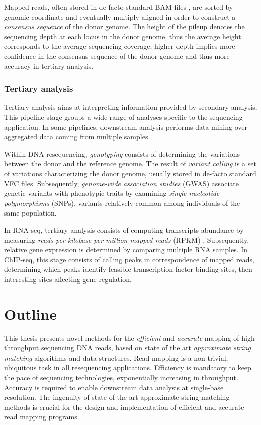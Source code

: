 Mapped reads, often stored in de-facto standard BAM files \citep{Li2009a}, are sorted by genomic coordinate and eventually multiply aligned in order to construct a \emph{consensus sequence} of the donor genome.
The height of the pileup denotes the sequencing depth at each locus in the donor genome, thus the average height corresponds to the average sequencing coverage;
higher depth implies more confidence in the consensus sequence of the donor genome and thus more accuracy in tertiary analysis.

\subsubsection{Tertiary analysis}

Tertiary analysis aims at interpreting information provided by secondary analysis.
This pipeline stage groups a wide range of analyses specific to the sequencing application.
In some pipelines, downstream analysis performs data mining over aggregated data coming from multiple samples.

Within DNA resequencing, \emph{genotyping} consists of determining the variations between the donor and the reference genome.
The result of \emph{variant calling} is a set of variations characterizing the donor genome, usually stored in de-facto standard VFC files.
Subsequently, \emph{genome-wide association studies} (GWAS) associate genetic variants with phenotypic traits by examining \emph{single-nucleotide polymorphisms} (SNPs), variants relatively common among individuals of the same population.

In RNA-seq, tertiary analysis consists of computing transcripts abundance by measuring \emph{reads per kilobase per million mapped reads} (RPKM) \citep{Mortazavi2008}.
Subsequently, relative gene expression is determined by comparing multiple RNA samples.
In ChIP-seq, this stage consists of calling peaks in correspondence of mapped reads, determining which peaks identify feasible transcription factor binding sites, then interesting sites affecting gene regulation.


\section{Outline}
\label{sec:intro:outline}

This thesis presents novel methods for the \emph{efficient} and \emph{accurate} mapping of high-throughput sequencing DNA reads, based on state of the art \emph{approximate string matching} algorithms and data structures.
Read mapping is a non-trivial, ubiquitous task in all resequencing applications.
Efficiency is mandatory to keep the pace of sequencing technologies, exponentially increasing in throughput.
Accuracy is required to enable downstream data analysis at single-base resolution.
The ingenuity of state of the art approximate string matching methods is crucial for the design and implementation of efficient and accurate read mapping programs.


